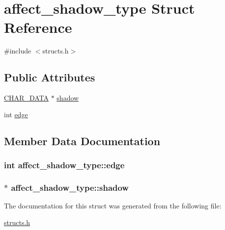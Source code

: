 \hypertarget{structaffect__shadow__type}{\section{affect\-\_\-shadow\-\_\-type Struct Reference}
\label{structaffect__shadow__type}
}


{\ttfamily \#include $<$structs.\-h$>$}

\subsection*{Public Attributes}
\begin{DoxyCompactItemize}
\item 
\hyperlink{structs_8h_af33ed1e66e8541a08bed257124f50f31}{C\-H\-A\-R\-\_\-\-D\-A\-T\-A} $\ast$ \hyperlink{structaffect__shadow__type_a5fb3a3032f598e437b17891fac18683c}{shadow}
\item 
int \hyperlink{structaffect__shadow__type_ae6504f8c4862ffceb0c60635ece1ab9b}{edge}
\end{DoxyCompactItemize}


\subsection{Member Data Documentation}
\hypertarget{structaffect__shadow__type_ae6504f8c4862ffceb0c60635ece1ab9b}{
\subsubsection[{edge}]{\setlength{\rightskip}{0pt plus 5cm}int affect\-\_\-shadow\-\_\-type\-::edge}}\label{structaffect__shadow__type_ae6504f8c4862ffceb0c60635ece1ab9b}
\hypertarget{structaffect__shadow__type_a5fb3a3032f598e437b17891fac18683c}{
\subsubsection[{shadow}]{$\ast$ affect\-\_\-shadow\-\_\-type\-::shadow}}\label{structaffect__shadow__type_a5fb3a3032f598e437b17891fac18683c}


The documentation for this struct was generated from the following file\-:\begin{DoxyCompactItemize}
\item 
\hyperlink{structs_8h}{structs.\-h}\end{DoxyCompactItemize}
